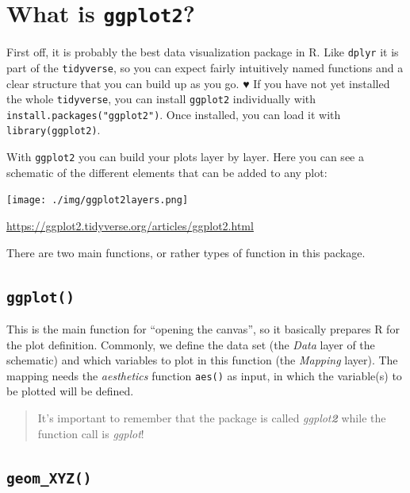 \documentclass[
]{book}
\begin{document}
\section{\texorpdfstring{What is \texttt{ggplot2}?}{What is ggplot2?}}\label{what-is-ggplot2}

First off, it is probably the best data visualization package in R.
Like \texttt{dplyr} it is part of the \texttt{tidyverse}, so you can expect fairly intuitively named functions and a clear structure that you can build up as you go. ♥
If you have not yet installed the whole \texttt{tidyverse}, you can install \texttt{ggplot2} individually with \texttt{install.packages("ggplot2")}.
Once installed, you can load it with \texttt{library(ggplot2)}.

With \texttt{ggplot2} you can build your plots layer by layer.
Here you can see a schematic of the different elements that can be added to any plot:

\texttt{[image: ./img/ggplot2layers.png]}

\url{https://ggplot2.tidyverse.org/articles/ggplot2.html}

There are two main functions, or rather types of function in this package.

\subsection*{\texorpdfstring{\texttt{ggplot()}}{ggplot()}}\label{ggplot}

This is the main function for ``opening the canvas'', so it basically prepares R for the plot definition.
Commonly, we define the data set (the \emph{Data} layer of the schematic) and which variables to plot in this function (the \emph{Mapping} layer).
The mapping needs the \emph{aesthetics} function \texttt{aes()} as input, in which the variable(s) to be plotted will be defined.

\begin{quote}
It's important to remember that the package is
called \emph{ggplot\textbf{2}} while the function call is \emph{ggplot}!
\end{quote}

\subsection*{\texorpdfstring{\texttt{geom\_XYZ()}}{geom\_XYZ()}}\label{geom_xyz}
\end{document}

